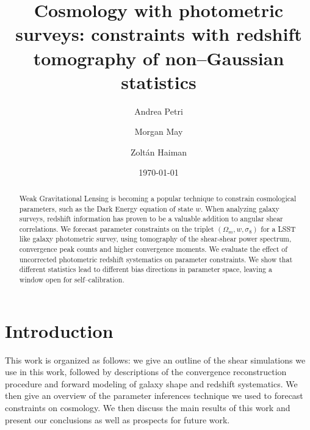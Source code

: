 \documentclass[reprint,aps,prd,superscriptaddress,showkeys,showpacs]{revtex4-1}
\begin{document}
\title{Cosmology with photometric surveys: constraints with redshift tomography of non--Gaussian statistics}

\author{Andrea Petri}

\author{Morgan May}

\author{Zolt\'an Haiman}

\date{\today}

\label{firstpage}

\begin{abstract}
Weak Gravitational Lensing is becoming a popular technique to constrain cosmological parameters, such as the Dark Energy equation of state $w$. When analyzing galaxy surveys, redshift information has proven to be a valuable addition to angular shear correlations. We forecast parameter constraints on the triplet $(\Omega_m,w,\sigma_8)$ for a LSST like galaxy photometric survey, using tomography of the shear-shear power spectrum, convergence peak counts and higher convergence moments. We evaluate the effect of uncorrected photometric redshift systematics on parameter constraints. We show that different statistics lead to different bias directions in parameter space, leaving a window open for self--calibration. 
\end{abstract}



\maketitle



\section{Introduction}
%
This work is organized as follows: we give an outline of the shear simulations we use in this work, followed by descriptions of the convergence reconstruction procedure and forward modeling of galaxy shape and redshift systematics. We then give an overview of the parameter inferences technique we used to forecast constraints on cosmology. We then discuss the main results of this work and present our conclusions as well as prospects for future work.  
\end{document}
